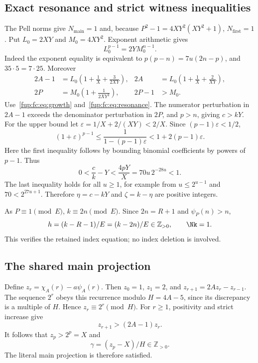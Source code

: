 \documentclass[11pt,letterpaper]{article}
\theoremstyle{definition}\newtheorem{definition}[theorem]{Definition}
\theoremstyle{remark}\newtheorem{remark}[theorem]{Remark}
\newcommand{\ch}[2]{\chi_{#1}(#2)}\newcommand{\ps}[2]{\psi_{#1}(#2)}
\newcommand{\Nf}{N_{\mathrm{first}}}\newcommand{\Nm}{N_{\mathrm{main}}}\newcommand{\Ni}{N_{\mathrm{input}}}
\begin{document}
\subsection{Exact resonance and strict witness inequalities}
The Pell norms give $\Nm=1$ and, because $P^2-1=4XY^2(XY^2+1)$,
$\Nf=1$. Put $L_0=2XY$ and $M_0=4XY^2$. Exponent arithmetic gives
\begin{equation}
 L_0^{p-1}=2Y M_0^{n-1}.\label{fup:fc:eq:resonance}
\end{equation}
Indeed the exponent equality is equivalent to
$p(p-n)=7u(2n-p)$, and $35\cdot5=7\cdot25$.
Moreover
\begin{align*}
 2A-1&=L_0\left(1+\frac1X+\frac{3}{2XY}\right),&
 2A&=L_0\left(1+\frac1X+\frac2{XY}\right),\\
 2P&=M_0\left(1+\frac1{2XY^2}\right),&2P-1&>M_0.
\end{align*}
Use~\eqref{fup:fc:eq:growth} and~\eqref{fup:fc:eq:resonance}. The numerator
perturbation in $2A-1$ exceeds the denominator perturbation in $2P$,
and $p>n$, giving $c>kY$. For the upper bound let
$\varepsilon=1/X+2/(XY)<2/X$. Since $(p-1)\varepsilon<1/2$,
\[
 (1+\varepsilon)^{p-1}
 \le\frac1{1-(p-1)\varepsilon}<1+2(p-1)\varepsilon.
\]
Here the first inequality follows by bounding binomial coefficients by
powers of $p-1$. Thus
\begin{equation}
 0<\frac ck-Y<\frac{4pY}{X}=70u\,2^{-28u}<1.\label{fup:fc:eq:ratio}
\end{equation}
The last inequality holds for all $u\ge1$, for example from
$u\le2^{u-1}$ and $70<2^{27u+1}$.
Therefore $\eta=c-kY$ and $\zeta=k-\eta$ are positive integers.

As $P\equiv1\pmod E$, $k\equiv2n\pmod E$.
Since $2n=R+1$ and $\ps P n>n$,
\begin{equation}
 h=(k-R-1)/E=(k-2n)/E\in\mathbb Z_{>0},\qquad\Nk=1.\label{fup:fc:eq:index}
\end{equation}
This verifies the retained index equation; no index deletion is involved.

\subsection{The shared main projection}
Define $z_r=\ch A r-a\ps A r$. Then $z_0=1$, $z_1=2$, and
$z_{r+1}=2Az_r-z_{r-1}$. The sequence $2^r$ obeys this recurrence
modulo $H=4A-5$, since its discrepancy is a multiple of $H$.
Hence $z_r\equiv2^r\pmod H$.
For $r\ge1$, positivity and strict increase give
\begin{equation}
 z_{r+1}>(2A-1)z_r.\label{fup:fc:eq:z-growth}
\end{equation}
It follows that $z_p>2^p=X$ and
\begin{equation}
 \gamma=(z_p-X)/H\in\mathbb Z_{>0}.\label{fup:fc:eq:gamma}
\end{equation}
The literal main projection is therefore satisfied.
\end{document}

